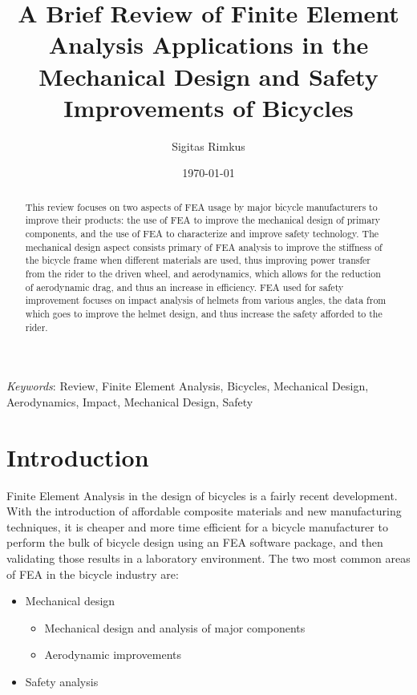 \documentclass[11pt]{article}
\begin{document}
\title{A Brief Review of Finite Element Analysis Applications in the Mechanical Design and Safety Improvements of Bicycles}
\author{Sigitas Rimkus}
\date{\today}
\maketitle

\begin{abstract}
This review focuses on two aspects of FEA usage by major bicycle manufacturers to improve their products: the use of FEA to improve the mechanical design of primary components, and the use of FEA to characterize and improve safety technology.  The mechanical design aspect consists primary of FEA analysis to improve the stiffness of the bicycle frame when different materials are used, thus improving power transfer from the rider to the driven wheel, and aerodynamics, which allows for the reduction of aerodynamic drag, and thus an increase in efficiency.  FEA used for safety improvement focuses on impact analysis of helmets from various angles, the data from which goes to improve the helmet design, and thus increase the safety afforded to the rider.
\end{abstract}

\vfill

\noindent\emph{Keywords}: Review, Finite Element Analysis, Bicycles, Mechanical Design, Aerodynamics, Impact, Mechanical Design, Safety

\vfill


\newpage
\doublespace

\section{Introduction}
Finite Element Analysis in the design of bicycles is a fairly recent development.  With the introduction of affordable composite materials and new manufacturing techniques, it is cheaper and more time efficient for a bicycle manufacturer to perform the bulk of bicycle design using an FEA software package, and then validating those results in a laboratory environment.  The two most common areas of FEA in the bicycle industry are:
\begin{itemize}
	\item{Mechanical design}
	\begin{itemize}
		\item{Mechanical design and analysis of major components}
		\item{Aerodynamic improvements}
	\end{itemize}
	\item{Safety analysis}
\end{itemize}
\end{document}
